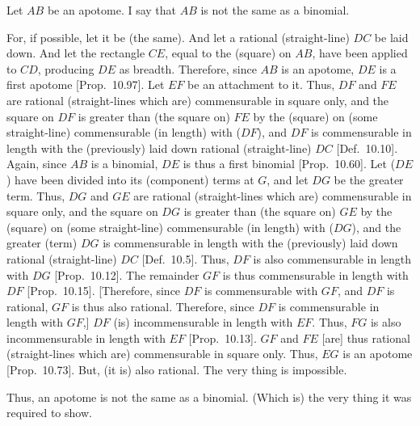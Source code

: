 \begin{Parallel}{}{}
{Let $AB$ be an apotome. I say that $AB$ is not the same as a binomial.

For, if possible, let it be (the same). And let a rational (straight-line)
$DC$ be laid down. And let the rectangle $CE$, equal to the (square) on $AB$, have been applied to $CD$, producing $DE$ as breadth. Therefore,
since $AB$ is an apotome, $DE$ is a first apotome [Prop.~10.97]. Let $EF$ be an attachment to it.
Thus, $DF$ and $FE$ are rational (straight-lines which are) commensurable
in square only, and the square on $DF$ is greater than (the square on)
$FE$ by the (square) on (some straight-line) commensurable (in length)
with ($DF$), and $DF$ is commensurable in length with the (previously)
laid down rational (straight-line) $DC$ [Def.~10.10]. 
Again, since $AB$ is a binomial, $DE$ is thus a first binomial [Prop.~10.60]. Let ($DE$) have been divided
into its (component) terms at $G$, and let $DG$ be the greater term.
Thus, $DG$ and $GE$ are rational (straight-lines which are)
commensurable in square only, and the square on $DG$ is greater
than (the square on) $GE$ by the (square) on (some straight-line)
commensurable (in length) with ($DG$), and the greater (term)
$DG$ is commensurable in length with the (previously)
laid down rational (straight-line) $DC$ [Def.~10.5].
Thus, $DF$ is also commensurable in length with $DG$ [Prop.~10.12].
The remainder $GF$ is thus commensurable in length with $DF$
[Prop.~10.15]. [Therefore, since
$DF$ is commensurable with $GF$, and $DF$ is rational, $GF$
is thus also rational. Therefore, since $DF$ is commensurable
in length with $GF$,] $DF$ (is) incommensurable in length with $EF$.
Thus, $FG$ is also incommensurable in length with $EF$ [Prop.~10.13]. $GF$ and $FE$ [are] thus
rational (straight-lines which are) commensurable in square only.
Thus, $EG$ is an apotome [Prop.~10.73].
But, (it is) also rational. The very thing is impossible.

Thus, an apotome is not the same as a binomial. (Which is) the very thing
it was required to show.}
\end{Parallel}

